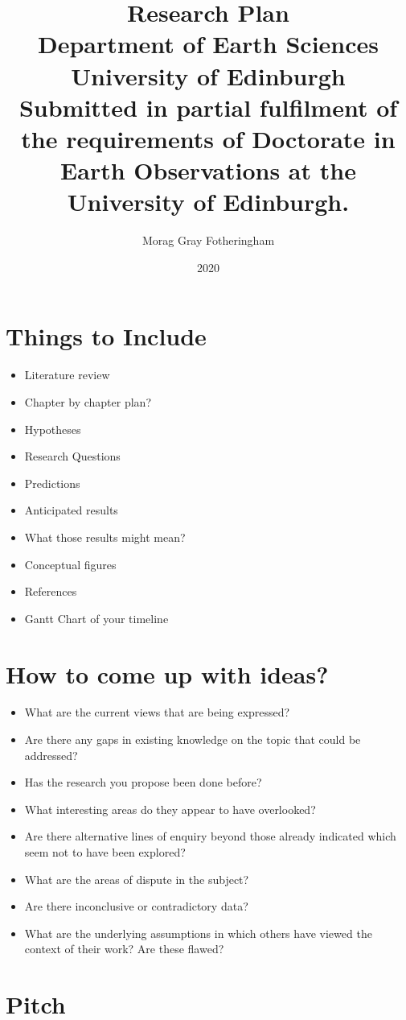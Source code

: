 \documentclass[12pt,twoside]{report}
\title{
{Research Plan}\\
{\large Department of Earth Sciences }\\
{\large University of Edinburgh}\\
{\small Submitted in partial fulfilment of the requirements of Doctorate in Earth Observations at the University of Edinburgh.}\\
}
\author{Morag Gray Fotheringham}
\date{2020}
\newcommand{\mychapter}[2]{
    \setcounter{chapter}{#1}
    \setcounter{section}{0}
    \chapter*{#2}
    \addcontentsline{toc}{chapter}{#2}
}
\begin{document}
\onehalfspacing
\maketitle 

\chapter*{Things to Include}
\begin{itemize}
\item Literature review
\item Chapter by chapter plan?
\item Hypotheses
\item Research Questions
\item Predictions
\item Anticipated results
\item What those results might mean?
\item Conceptual figures
\item References
\item Gantt Chart of your timeline
\end{itemize}
 
\chapter*{How to come up with ideas?}
\begin{itemize}
\item What are the current views that are being expressed?
\item Are there any gaps in existing knowledge on the topic that could be addressed?
\item Has the research you propose been done before?
\item What interesting areas do they appear to have overlooked?
\item Are there alternative lines of enquiry beyond those already indicated which seem not to have been
explored?
\item What are the areas of dispute in the subject?
\item Are there inconclusive or contradictory data?
\item What are the underlying assumptions in which others have viewed the context of their work? Are
these flawed?
\end{itemize}

\tableofcontents

\mychapter{1}{Pitch}
\end{document}
